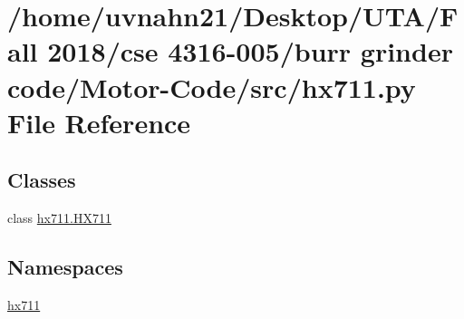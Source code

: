 \hypertarget{Motor-Code_2src_2hx711_8py}{}\section{/home/uvnahn21/\+Desktop/\+U\+T\+A/\+Fall 2018/cse 4316-\/005/burr grinder code/\+Motor-\/\+Code/src/hx711.py File Reference}
\label{Motor-Code_2src_2hx711_8py}
\subsection*{Classes}
\begin{DoxyCompactItemize}
\item 
class \hyperlink{classhx711_1_1HX711}{hx711.\+H\+X711}
\end{DoxyCompactItemize}
\subsection*{Namespaces}
\begin{DoxyCompactItemize}
\item 
 \hyperlink{namespacehx711}{hx711}
\end{DoxyCompactItemize}
